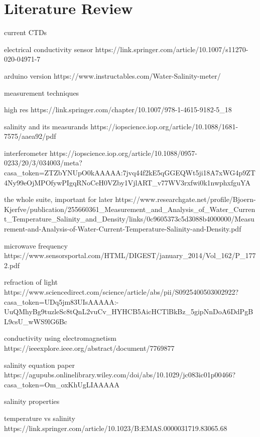 \chapter{Literature Review} \label{ch:literature}

current CTDs

electrical conductivity sensor https://link.springer.com/article/10.1007/s11270-020-04971-7

arduino version https://www.instructables.com/Water-Salinity-meter/

measurement techniques

high res https://link.springer.com/chapter/10.1007/978-1-4615-9182-5_18

salinity and its measurands https://iopscience.iop.org/article/10.1088/1681-7575/aaea92/pdf

interferometer https://iopscience.iop.org/article/10.1088/0957-0233/20/3/034003/meta?casa_token=ZTZbYNUpO0kAAAAA:7jvq44f2kE5qGGEQWt5ji18A7xWG4p9ZT4Ny99eOjMPOfywPIgqRNoCeH0VZby1VjlART_v77WV3rxfwi0k1nwphxfguYA

the whole suite, important for later https://www.researchgate.net/profile/Bjoern-Kjerfve/publication/255660361_Measurement_and_Analysis_of_Water_Current_Temperature_Salinity_and_Density/links/0c9605373c5d3088b4000000/Measurement-and-Analysis-of-Water-Current-Temperature-Salinity-and-Density.pdf

microwave frequency https://www.sensorsportal.com/HTML/DIGEST/january_2014/Vol_162/P_1772.pdf

refraction of light https://www.sciencedirect.com/science/article/abs/pii/S0925400503002922?casa_token=UDq5jm83UIsAAAAA:-UuQMhyBg9tuzleSc8tQnL2vuCv_HYHCB5AicHCTlBkBz_5gipNnDoA6DdPgBL9csU_wWS9lG6Bc

conductivity using electromagnetism https://ieeexplore.ieee.org/abstract/document/7769877

salinity equation paper https://agupubs.onlinelibrary.wiley.com/doi/abs/10.1029/jc083ic01p00466?casa_token=Om_oxKhUgLIAAAAA%

salinity properties

temperature vs salinity https://link.springer.com/article/10.1023/B:EMAS.0000031719.83065.68


